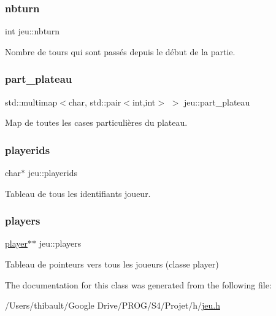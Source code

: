 \subsubsection{\texorpdfstring{nbturn}{nbturn}}
{\footnotesize\ttfamily int jeu\+::nbturn\hspace{0.3cm}{\ttfamily [private]}}



Nombre de tours qui sont passés depuis le début de la partie. 

\mbox{\label{classjeu_abd8f4b8b02d750e302903f616e897ad0}} 
\subsubsection{\texorpdfstring{part\+\_\+plateau}{part\_plateau}}
{\footnotesize\ttfamily std\+::multimap$<$char, std\+::pair$<$int,int$>$ $>$ jeu\+::part\+\_\+plateau\hspace{0.3cm}{\ttfamily [private]}}



Map de toutes les cases particulières du plateau. 

\mbox{\label{classjeu_ada4888da3a6c7036f47f47515f87a983}} 
\subsubsection{\texorpdfstring{playerids}{playerids}}
{\footnotesize\ttfamily char$\ast$ jeu\+::playerids\hspace{0.3cm}{\ttfamily [private]}}



Tableau de tous les identifiants joueur. 

\mbox{\label{classjeu_ae005d31d8935c2d9e7ddb53d25efcc31}} 
\subsubsection{\texorpdfstring{players}{players}}
{\footnotesize\ttfamily \hyperlink{classplayer}{player}$\ast$$\ast$ jeu\+::players\hspace{0.3cm}{\ttfamily [private]}}



Tableau de pointeurs vers tous les joueurs (classe player) 



The documentation for this class was generated from the following file\+:\begin{DoxyCompactItemize}
\item 
/\+Users/thibault/\+Google Drive/\+P\+R\+O\+G/\+S4/\+Projet/h/\hyperlink{jeu_8h}{jeu.\+h}\end{DoxyCompactItemize}
